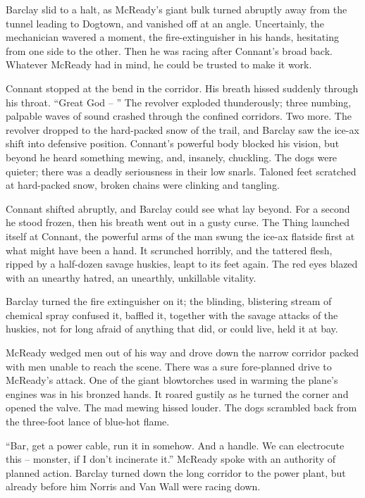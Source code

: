 \documentclass[ebook,oneside,11pt]{memoir}				%
\begin{document}
Barclay slid to a halt, as McReady's giant bulk turned abruptly away from the tunnel leading to Dogtown, and vanished off at an angle. Uncertainly, the mechanician wavered a moment, the fire-extinguisher in his hands, hesitating from one side to the other. Then he was racing after Connant's broad back. Whatever McReady had in mind, he could be trusted to make it work.

Connant stopped at the bend in the corridor. His breath hissed suddenly through his throat. ``Great God -- '' The revolver exploded thunderously; three numbing, palpable waves of sound crashed through the confined corridors. Two more. The revolver dropped to the hard-packed snow of the trail, and Barclay saw the ice-ax shift into defensive position. Connant's powerful body blocked his vision, but beyond he heard something mewing, and, insanely, chuckling. The dogs were quieter; there was a deadly seriousness in their low snarls. Taloned feet scratched at hard-packed snow, broken chains were clinking and tangling.

Connant shifted abruptly, and Barclay could see what lay beyond. For a second he stood frozen, then his breath went out in a gusty curse. The Thing launched itself at Connant, the powerful arms of the man swung the ice-ax flatside first at what might have been a hand. It scrunched horribly, and the tattered flesh, ripped by a half-dozen savage huskies, leapt to its feet again. The red eyes blazed with an unearthy hatred, an unearthly, unkillable vitality.

Barclay turned the fire extinguisher on it; the blinding, blistering stream of chemical spray confused it, baffled it, together with the savage attacks of the huskies, not for long afraid of anything that did, or could live, held it at bay.

McReady wedged men out of his way and drove down the narrow corridor packed with men unable to reach the scene. There was a sure fore-planned drive to McReady's attack. One of the giant blowtorches used in warming the plane's engines was in his bronzed hands. It roared gustily as he turned the corner and opened the valve. The mad mewing hissed louder. The dogs scrambled back from the three-foot lance of blue-hot flame.

``Bar, get a power cable, run it in somehow. And a handle. We can electrocute this -- monster, if I don't incinerate it.'' McReady spoke with an authority of planned action. Barclay turned down the long corridor to the power plant, but already before him Norris and Van Wall were racing down.
\end{document}
